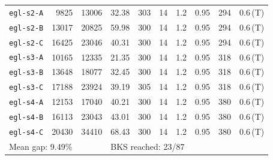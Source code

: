 \begin{longtable}{lrrrrrrrrl}
\texttt{egl-s2-A} & 9825 & 13006 & 32.38 & 303 & 14 & 1.2 & 0.95 & 294 & 0.6\,(T) \\
\texttt{egl-s2-B} & 13017 & 20825 & 59.98 & 300 & 14 & 1.2 & 0.95 & 294 & 0.6\,(T) \\
\texttt{egl-s2-C} & 16425 & 23046 & 40.31 & 300 & 14 & 1.2 & 0.95 & 294 & 0.6\,(T) \\
\texttt{egl-s3-A} & 10165 & 12335 & 21.35 & 300 & 14 & 1.2 & 0.95 & 318 & 0.6\,(T) \\
\texttt{egl-s3-B} & 13648 & 18077 & 32.45 & 300 & 14 & 1.2 & 0.95 & 318 & 0.6\,(T) \\
\texttt{egl-s3-C} & 17188 & 23924 & 39.19 & 305 & 14 & 1.2 & 0.95 & 318 & 0.6\,(T) \\
\texttt{egl-s4-A} & 12153 & 17040 & 40.21 & 300 & 14 & 1.2 & 0.95 & 380 & 0.6\,(T) \\
\texttt{egl-s4-B} & 16113 & 23043 & 43.01 & 300 & 14 & 1.2 & 0.95 & 380 & 0.6\,(T) \\
\texttt{egl-s4-C} & 20430 & 34410 & 68.43 & 300 & 14 & 1.2 & 0.95 & 380 & 0.6\,(T) \\
\midrule
\multicolumn{3}{l}{Mean gap: 9.49\%} & \multicolumn{7}{l}{BKS reached: 23/87} \\
\end{longtable}
\endgroup